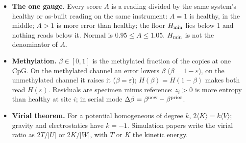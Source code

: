 \begin{itemize}
\item \textbf{The one gauge.} Every score $A$ is a reading divided by the same system's healthy or as-built reading on the same instrument: $A=1$ is healthy, in
the middle; $A>1$ is more error than healthy; the floor $H_{\min}$ lies below 1 and nothing reads below it. Normal is $0.95\le A\le1.05$. $H_{\min}$ is not the denominator of $A$.
\item \textbf{Methylation.} $\beta\in[0,1]$ is the methylated fraction of the copies at one CpG. On the methylated channel an error lowers $\beta$
($\beta=1-\varepsilon$), on the unmethylated channel it raises it ($\beta=\varepsilon$); $H(\beta)=H(1-\beta)$ makes both read $H(\varepsilon)$. Residuals are
specimen minus reference: $z_i>0$ is more entropy than healthy at site $i$; in serial mode $\Delta\beta=\beta^{\rm now}-\beta^{\rm prior}$.
\item \textbf{Virial theorem.} For a potential homogeneous of degree $k$, $2\langle K\rangle=k\langle V\rangle$; gravity and electrostatics have $k=-1$.
Simulation papers write the virial ratio as $2T/|U|$ or $2K/|W|$, with $T$ or $K$ the kinetic energy.
\end{itemize}

